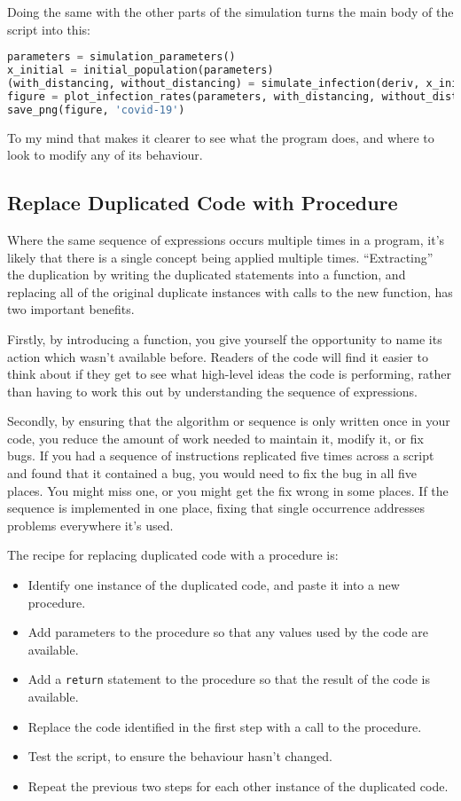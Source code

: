 \documentclass[a4paper]{article}
\begin{document}
Doing the same with the other parts of the simulation turns the main body of the script into this:

\begin{lstlisting}[language=Python]
parameters = simulation_parameters()
x_initial = initial_population(parameters)
(with_distancing, without_distancing) = simulate_infection(deriv, x_initial, parameters)
figure = plot_infection_rates(parameters, with_distancing, without_distancing)
save_png(figure, 'covid-19')
\end{lstlisting}

To my mind that makes it clearer to see what the program does, and where to look to modify any of its behaviour.

\subsection{Replace Duplicated Code with Procedure}

Where the same sequence of expressions occurs multiple times in a program, it's likely that there is a single concept being applied multiple times.
``Extracting'' the duplication by writing the duplicated statements into a function, and replacing all of the original duplicate instances with calls to the new function, has two important benefits.

Firstly, by introducing a function, you give yourself the opportunity to name its action which wasn't available before.
Readers of the code will find it easier to think about if they get to see what high-level ideas the code is performing, rather than having to work this out by understanding the sequence of expressions.

Secondly, by ensuring that the algorithm or sequence is only written once in your code, you reduce the amount of work needed to maintain it, modify it, or fix bugs.
If you had a sequence of instructions replicated five times across a script and found that it contained a bug, you would need to fix the bug in all five places.
You might miss one, or you might get the fix wrong in some places.
If the sequence is implemented in one place, fixing that single occurrence addresses problems everywhere it's used.

The recipe for replacing duplicated code with a procedure is:

\begin{itemize}
  \item Identify one instance of the duplicated code, and paste it into a new procedure.
  \item Add parameters to the procedure so that any values used by the code are available.
  \item Add a \texttt{return} statement to the procedure so that the result of the code is available.
  \item Replace the code identified in the first step with a call to the procedure.
  \item Test the script, to ensure the behaviour hasn't changed.
  \item Repeat the previous two steps for each other instance of the duplicated code.
\end{itemize}
\end{document}
